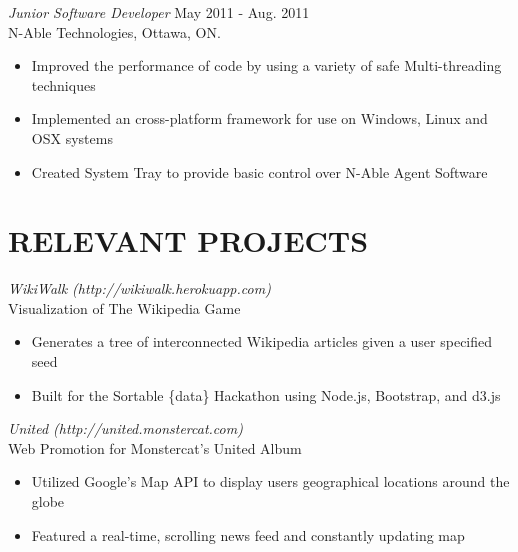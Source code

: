 \documentclass[margin]{res}
\begin{document}
\begin{resume}
{\sl Junior Software Developer} \hfill May 2011 - Aug. 2011 \\
N-Able Technologies, Ottawa, ON.
\begin{itemize} \itemsep -2pt
  \item Improved the performance of code by using a variety of safe Multi-threading techniques
  \item Implemented an cross-platform framework for use on Windows, Linux and OSX systems
  \item Created System Tray to provide basic control over N-Able Agent Software
\end{itemize}

\section{RELEVANT PROJECTS}

{\sl WikiWalk (http://wikiwalk.herokuapp.com) } \\
Visualization of The Wikipedia Game
\begin{itemize} \itemsep -2pt
  \item Generates a tree of interconnected Wikipedia articles given a user specified seed
  \item Built for the Sortable \{data\} Hackathon using Node.js, Bootstrap, and d3.js
\end{itemize}

{\sl United (http://united.monstercat.com) } \\
Web Promotion for Monstercat's United Album
\begin{itemize} \itemsep -2pt
  \item Utilized Google's Map API to display users geographical locations around the globe
  \item Featured a real-time, scrolling news feed and constantly updating map
\end{itemize}




\end{resume}
\end{document}
